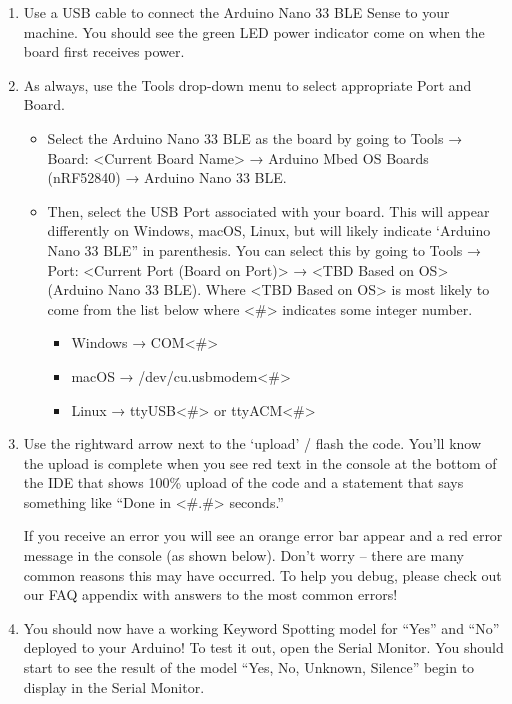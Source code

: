 \begin{enumerate}
    \item Use a USB cable to connect the Arduino Nano 33 BLE Sense to your machine. You should see the green LED power indicator come on when the board first receives power.
    
    \item As always, use the Tools drop-down menu to select appropriate Port and Board.
    
      \begin{itemize}
        \item Select the Arduino Nano 33 BLE as the board by going to Tools → Board: <Current Board Name> → Arduino Mbed OS Boards (nRF52840) → Arduino Nano 33 BLE.

        \item Then, select the USB Port associated with your board. This will appear differently on Windows, macOS, Linux, but will likely indicate ‘Arduino Nano 33 BLE” in parenthesis. You can select this by going to Tools → Port: <Current Port (Board on Port)> → <TBD Based on OS> (Arduino Nano 33 BLE). Where <TBD Based on OS> is most likely to come from the list below where <\#> indicates some integer number.

          \begin{itemize}
            \item Windows → COM<\#>
            \item macOS → /dev/cu.usbmodem<\#>
            \item Linux → ttyUSB<\#> or ttyACM<\#>
        \end{itemize}
      \end{itemize}

    \item     Use the rightward arrow next to the ‘upload’ / flash the code. You’ll know the upload is complete when you see red text in the console at the bottom of the IDE that shows 100\% upload of the code and a statement that says something like “Done in <\#.\#> seconds.”
    
    If you receive an error you will see an orange error bar appear and a red error message in the console (as shown below). Don’t worry -- there are many common reasons this may have occurred. To help you debug, please check out our FAQ appendix with answers to the most common errors!
    
    \item You should now have a working Keyword Spotting model for “Yes” and “No” deployed to your Arduino! To test it out, open the Serial Monitor. You should start to see the result of the model “Yes, No, Unknown, Silence” begin to display in the Serial Monitor.


\end{enumerate}
